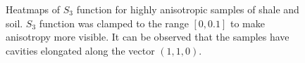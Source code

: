 \documentclass[reprint,amsmath,amssymb,aps,pre,showkeys,showpacs]{revtex4-1}
\begin{document}
\begin{figure}[tp]
  \centering
  \hfill
  \hfill
  \caption[]{Heatmaps of $S_3$ function for highly anisotropic samples of shale
    and soil. $S_3$ function was clamped to the range $[0, 0.1]$ to make
    anisotropy more visible. It can be observed that the samples have
    cavities elongated along the vector $(1, 1, 0)$.}
  \label{fig:heatmaps}
\end{figure}
\end{document}
